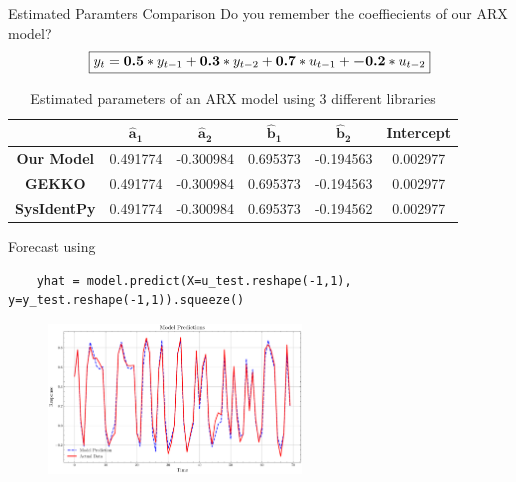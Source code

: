 \documentclass[aspectratio=169,hyperref={pdfpagelabels=false}]{beamer}
\begin{document}

\begin{frame}{Estimated Paramters Comparison}
  Do you remember the coeffiecients of our ARX model? 
    \begin{align*}\centering 
      \boxed{y_t = \bm{0.5}* y_{t-1} + \bm{0.3} * y_{t-2} +  \bm{0.7}*u_{t-1} + \bm{-0.2}* u_{t-2}} 
    \end{align*} \pause
    \begin{table}[h]
      \centering
      \renewcommand{\arraystretch}{1.5} %
      \begin{tabular}{|c|c|c|c|c|c|}
        \hline
        \textbf{} & $\boldsymbol{\hat{a}_1}$ & $\boldsymbol{\hat{a}_2}$ & $\boldsymbol{\hat{b}_1}$ & $\boldsymbol{\hat{b}_2}$ & \textbf{Intercept} \\ 
        \hline \hline
        \textbf{Our Model} & 0.491774 & -0.300984 & 0.695373 & -0.194563 &  0.002977 \\ 
        \hline
        \textbf{GEKKO} & 0.491774 & -0.300984 & 0.695373 & -0.194563 & 0.002977\\ 
        \hline
        \textbf{SysIdentPy} & 0.491774 & -0.300984 & 0.695373 & -0.194562 & 0.002977 \\ 
        \hline
      \end{tabular}
      \caption{Estimated parameters of an ARX model using 3 different libraries}
      \label{your_label}
    \end{table}
\end{frame}

\begin{frame}[fragile]{Forecast  using  }
  \begin{verbatim}
    yhat = model.predict(X=u_test.reshape(-1,1), y=y_test.reshape(-1,1)).squeeze()
  \end{verbatim}
  \begin{figure}
    \centering
    \includegraphics[width=0.6\textwidth]{img/response_yhat.pdf}
  \end{figure}
  
\end{frame}
\end{document}
